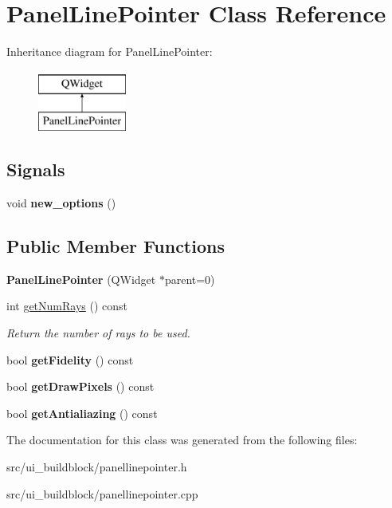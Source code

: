 \hypertarget{classPanelLinePointer}{}\section{Panel\+Line\+Pointer Class Reference}
\label{classPanelLinePointer}
Inheritance diagram for Panel\+Line\+Pointer\+:\begin{figure}[H]
\begin{center}
\leavevmode
\includegraphics[height=2.000000cm]{classPanelLinePointer}
\end{center}
\end{figure}
\subsection*{Signals}
\begin{DoxyCompactItemize}
\item 
\mbox{\label{classPanelLinePointer_aa7fd10395dca3172441d8f131670d014}} 
void {\bfseries new\+\_\+options} ()
\end{DoxyCompactItemize}
\subsection*{Public Member Functions}
\begin{DoxyCompactItemize}
\item 
\mbox{\label{classPanelLinePointer_a450331ef5c7d4bab97d341d0175d4c5c}} 
{\bfseries Panel\+Line\+Pointer} (Q\+Widget $\ast$parent=0)
\item 
\mbox{\label{classPanelLinePointer_a8f3fabdf4ead8d94ed1dee4aa5fe202e}} 
int \mbox{\hyperlink{classPanelLinePointer_a8f3fabdf4ead8d94ed1dee4aa5fe202e}{get\+Num\+Rays}} () const
\begin{DoxyCompactList}\small\item\em Return the number of rays to be used. \end{DoxyCompactList}\item 
\mbox{\label{classPanelLinePointer_a0a7d3adc7d8a04c3fcce25e5449d9506}} 
bool {\bfseries get\+Fidelity} () const
\item 
\mbox{\label{classPanelLinePointer_a5ed7cf8f59bae287d75b6eba99d95334}} 
bool {\bfseries get\+Draw\+Pixels} () const
\item 
\mbox{\label{classPanelLinePointer_a618ef022ec836d9fdbd0def1269b35ff}} 
bool {\bfseries get\+Antialiazing} () const
\end{DoxyCompactItemize}


The documentation for this class was generated from the following files\+:\begin{DoxyCompactItemize}
\item 
src/ui\+\_\+buildblock/panellinepointer.\+h\item 
src/ui\+\_\+buildblock/panellinepointer.\+cpp\end{DoxyCompactItemize}
